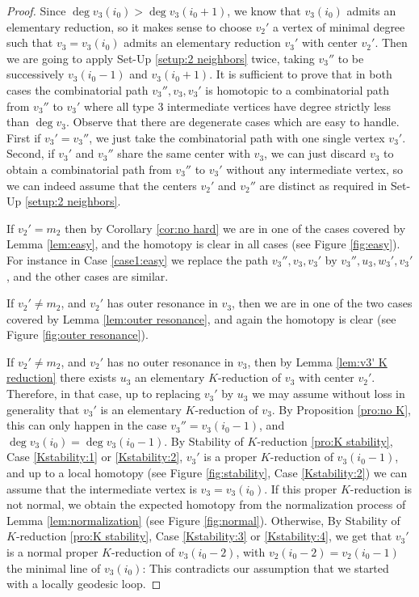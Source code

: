 \documentclass[reqno,oneside,11pt]{amsart}
\theoremstyle{plain}
\theoremstyle{definition}
\begin{document}
\begin{proof}
Since $\deg v_3(i_0) > \deg v_3(i_0+1)$, we know that $v_3(i_0)$ admits an
elementary reduction, so it makes sense to choose $v_2'$ a vertex of
minimal degree such that $v_3 = v_3(i_0)$ admits an elementary reduction $v_3'$
with center $v_2'$.
Then we are going to apply Set-Up \ref{setup:2 neighbors} twice, taking $v_3''$ to be
successively $v_3(i_0-1)$ and $v_3(i_0+1)$.
It is sufficient to prove that in both cases the combinatorial path $v_3'', v_3, v_3'$
is homotopic to a combinatorial path from $v_3''$ to $v_3'$ where all
type 3 intermediate vertices have degree strictly less than $\deg v_3$.
Observe that there are degenerate cases which are easy to handle.
First if $v_3' = v_3''$, we just take the combinatorial path with one single vertex $v_3'$.
Second, if $v_3'$ and $v_3''$ share the same center with $v_3$, we can just discard $v_3$ to obtain a combinatorial path from $v_3''$ to $v_3'$ without any intermediate vertex, so we can indeed
assume that the centers $v_2'$ and $v_2''$ are distinct as required in Set-Up
\ref{setup:2 neighbors}.

If $v_2' = m_2$ then by Corollary \ref{cor:no hard} we are in one of the cases
covered by Lemma \ref{lem:easy}, and the homotopy is clear in all cases (see
Figure \ref{fig:easy}).
For instance in Case \ref{case1:easy} we replace the path $v_3'', v_3, v_3'$ by
$v_3'', u_3, w_3', v_3'$, and the other cases are similar.


If $v_2' \neq m_2$, and $v_2'$ has outer resonance in $v_3$, then we are in one of the two cases covered by Lemma \ref{lem:outer resonance}, and again the homotopy is clear (see Figure \ref{fig:outer resonance}).

If $v_2' \neq m_2$, and $v_2'$ has no outer resonance in $v_3$, then by Lemma
\ref{lem:v3' K reduction} there exists $u_3$ an elementary $K$-reduction of
$v_3$ with center $v_2'$.
Therefore, in that case, up to replacing $v_3'$ by $u_3$ we may assume without loss in generality that $v_3'$ is an elementary $K$-reduction of $v_3$.
By Proposition \ref{pro:no K}, this can only happen in the case $v_3'' = v_3(i_0
- 1)$, and $\deg v_3(i_0) = \deg v_3(i_0 - 1)$.
By Stability of $K$-reduction \ref{pro:K stability}, Case \ref{Kstability:1} or
\ref{Kstability:2}, $v_3'$ is a proper
$K$-reduction of $v_3(i_0 - 1)$, and up to a local homotopy (see Figure
\ref{fig:stability}, Case \ref{Kstability:2}) we can
assume that the intermediate vertex is $v_3 = v_3(i_0)$.
If this proper $K$-reduction is not normal, we obtain the expected homotopy from
the normalization process of Lemma \ref{lem:normalization} (see Figure
\ref{fig:normal}).
Otherwise, By Stability of $K$-reduction \ref{pro:K stability},  Case \ref{Kstability:3} or
\ref{Kstability:4}, we get that
$v_3'$ is a normal proper $K$-reduction of $v_3(i_0 - 2)$, with $v_2(i_0 -2) =
v_2(i_0-1)$ the minimal line of $v_3(i_0)$: This contradicts our assumption
that we started with a locally geodesic loop.
\end{proof}
\end{document}
